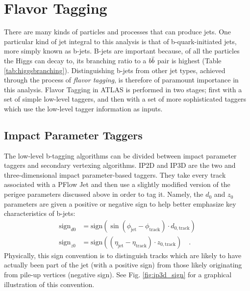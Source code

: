     \FloatBarrier
    \section{Flavor Tagging}
        
        There are many kinds of particles and processes that can produce jets.
        One particular kind of jet integral to this analysis is that of b-quark-initiated jets,
            more simply known as b-jets.
        B-jets are important because, of all the particles the Higgs can decay to,
            its branching ratio to a $b \bar{b}$ pair is highest (Table \ref{tab:higgsbranching}).
        Distinguishing b-jets from other jet types,
            achieved through the process of \textit{flavor tagging},
            is therefore of paramount importance in this analysis.
        Flavor Tagging in ATLAS is performed in two stages;
            first with a set of simple low-level taggers,
            and then with a set of more sophisticated taggers which use the low-level tagger information as inputs.


        \FloatBarrier
        \subsection{Impact Parameter Taggers}

            The low-level b-tagging algorithms can be divided between impact parameter taggers and secondary vertexing algorithms.
            IP2D and IP3D are the two and three-dimensional impact parameter-based taggers.
            They take every track associated with a PFlow Jet
                and then use a slightly modified version of the perigee parameters discussed above in order to tag it.
            Namely, the $d_0$ and $z_0$ parameters are given a positive or negative sign to help better emphasize key characteristics of b-jets\cite{thesis_giacinto}:
            \begin{equation} \begin{split}
                \textrm{sign}_{d0} &= \textrm{sign}(\sin(\phi_{\textrm{jet}} - \phi_{\textrm{track}}) \cdot d_{0,\textrm{track}}) \\
                \textrm{sign}_{z0} &= \textrm{sign}((\eta_{\textrm{jet}} - \eta_{\textrm{track}}) \cdot z_{0,\textrm{track}})
                \quad.
            \end{split} \end{equation}
            Physically, this sign convention is to distinguish tracks which are likely to have actually been part of the jet (with a positive sign)
                from those likely originating from pile-up vertices (negative sign).
            See Fig. \ref{fig:ip3d_sign} for a graphical illustration of this convention.

